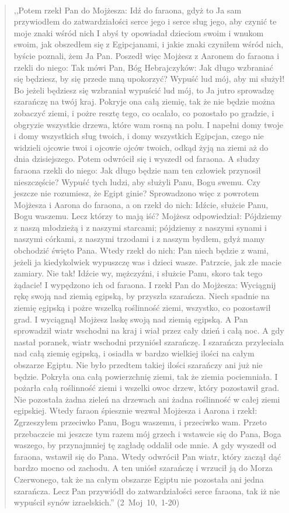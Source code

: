 \documentclass[10pt,a4paper,oneside]{article}
\begin{document}
\paragraph{}
\begin{quote}
,,Potem rzekł Pan do Mojżesza: Idź do faraona, gdyż to Ja sam przywiodłem do zatwardziałości serce jego i serce sług jego, aby czynić te moje znaki wśród nich I abyś ty opowiadał dzieciom swoim i wnukom swoim, jak obszedłem się z Egipcjanami, i jakie znaki czyniłem wśród nich, byście poznali, żem Ja Pan. Poszedł więc Mojżesz z Aaronem do faraona i rzekli do niego: Tak mówi Pan, Bóg Hebrajczyków: Jak długo wzbraniać się będziesz, by się przede mną upokorzyć? Wypuść lud mój, aby mi służył! Bo jeżeli będziesz się wzbraniał wypuścić lud mój, to Ja jutro sprowadzę szarańczę na twój kraj. Pokryje ona całą ziemię, tak że nie będzie można zobaczyć ziemi, i pożre resztę tego, co ocalało, co pozostało po gradzie, i obgryzie wszystkie drzewa, które wam rosną na polu. I napełni domy twoje i domy wszystkich sług twoich, i domy wszystkich Egipcjan, czego nie widzieli ojcowie twoi i ojcowie ojców twoich, odkąd żyją na ziemi aż do dnia dzisiejszego. Potem odwrócił się i wyszedł od faraona. A słudzy faraona rzekli do niego: Jak długo będzie nam ten człowiek przynosił nieszczęście? Wypuść tych ludzi, aby służyli Panu, Bogu swemu. Czy jeszcze nie rozumiesz, że Egipt ginie? Sprowadzono więc z powrotem Mojżesza i Aarona do faraona, a on rzekł do nich: Idźcie, służcie Panu, Bogu waszemu. Lecz którzy to mają iść? Mojżesz odpowiedział: Pójdziemy z naszą młodzieżą i z naszymi starcami; pójdziemy z naszymi synami i naszymi córkami, z naszymi trzodami i z naszym bydłem, gdyż mamy obchodzić święto Pana. Wtedy rzekł do nich: Pan niech będzie z wami, jeżeli ja kiedykolwiek wypuszczę was i dzieci wasze. Patrzcie, jak złe macie zamiary. Nie tak! Idźcie wy, mężczyźni, i służcie Panu, skoro tak tego żądacie! I wypędzono ich od faraona. I rzekł Pan do Mojżesza: Wyciągnij rękę swoją nad ziemią egipską, by przyszła szarańcza. Niech spadnie na ziemię egipską i pożre wszelką roślinność ziemi, wszystko, co pozostawił grad. I wyciągnął Mojżesz laskę swoją nad ziemią egipską. A Pan sprowadził wiatr wschodni na kraj i wiał przez cały dzień i całą noc. A gdy nastał poranek, wiatr wschodni przyniósł szarańczę. I szarańcza przyleciała nad całą ziemię egipską, i osiadła w bardzo wielkiej ilości na całym obszarze Egiptu. Nie było przedtem takiej ilości szarańczy ani już nie będzie. Pokryła ona całą powierzchnię ziemi, tak że ziemia pociemniała. I pożarła całą roślinność ziemi i wszelki owoc drzew, który pozostawił grad. Nie pozostała żadna zieleń na drzewach ani żadna roślinność w całej ziemi egipskiej. Wtedy faraon śpiesznie wezwał Mojżesza i Aarona i rzekł: Zgrzeszyłem przeciwko Panu, Bogu waszemu, i przeciwko wam. Przeto przebaczcie mi jeszcze tym razem mój grzech i wstawcie się do Pana, Boga waszego, by przynajmniej tę zagładę oddalił ode mnie. A gdy wyszedł od faraona, wstawił się do Pana. Wtedy odwrócił Pan wiatr, który zaczął dąć bardzo mocno od zachodu. A ten uniósł szarańczę i wrzucił ją do Morza Czerwonego, tak że na całym obszarze Egiptu nie pozostała ani jedna szarańcza. Lecz Pan przywiódł do zatwardziałości serce faraona, tak iż nie wypuścił synów izraelskich.'' \mbox{(2 Moj 10, 1-20)}
\end{quote}
\end{document}
